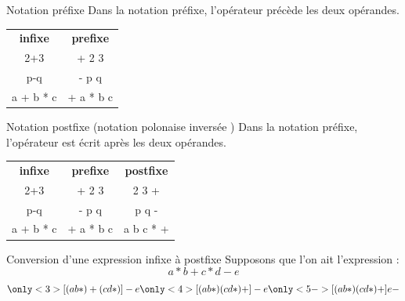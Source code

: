 \documentclass[10pt,xcolor=dvipsnames]{beamer}
\begin{document}
\begin{frame}{Notation préfixe}
    Dans la notation préfixe, l'opérateur précède les deux opérandes.
    
    \begin{table}[]
\begin{tabular}{cc}
\textbf{infixe} & \textbf{prefixe} \\
2+3             & + 2 3            \\
p-q             & - p q            \\
a + b * c       & + a * b c       
\end{tabular}
\end{table}
\end{frame}

\begin{frame}{Notation postfixe (notation polonaise inversée )}
     Dans la notation préfixe, l'opérateur est écrit après les deux opérandes.
     
     \begin{table}[]
\begin{tabular}{ccc}
\textbf{infixe} & \textbf{prefixe} & \textbf{postfixe} \\
2+3             & + 2 3            & 2 3 +             \\
p-q             & - p q            & p q -             \\
a + b * c       & + a * b c        & a b c * +        
\end{tabular}
\end{table}

\end{frame}

\begin{frame}{Conversion d'une expression infixe à postfixe}
    Supposons que l'on ait l'expression :
    \begin{equation*}
        a * b + c * d - e
    \end{equation*}
    \begin{equation*}
        \only<3>{
            [(a b *) + (c d *) ] - e
        }
        \only<4>{
            [(a b *) (c d *) + ] - e
        }
        \only<5->{
            [(a b *) (c d *) + ] e -
        }
    \end{equation*}
\end{frame}
\end{document}
